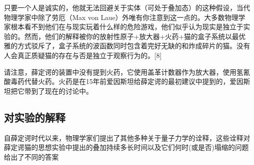 只要一个人是诚实的，他就无法回避关于实体（可处于叠加态）的这种假设，当代物理学家中除了劳厄（Max von Laue）外唯有你注意到这一点的。大多数物理学家根本看不到他们在与现实玩着什么样的危险游戏，他们似乎认为现实是独立于实验的。然而，他们的解释被你的放射性原子+放大器+火药+猫的盒子系统以最优雅的方式驳斥了，盒子系统的波函数同时包含着完好无缺的和炸成碎片的猫。没有人会真正质疑猫的存在与否是独立于观察行为的。[8]

请注意，薛定谔的装置中没有提到火药，它使用盖革计数器作为放大器，使用氢氰酸毒药代替火药。火药是在15年前爱因斯坦给薛定谔的最初建议中提到的，爱因斯坦把它带到了现在的讨论中。

\subsection{对实验的解释}
自薛定谔时代以来，物理学家们提出了其他多种关于量子力学的诠释，这些诠释对薛定谔猫的思想实验中提出的叠加持续多长时间以及它们何时(或是否)塌缩的问题给出了不同的答案